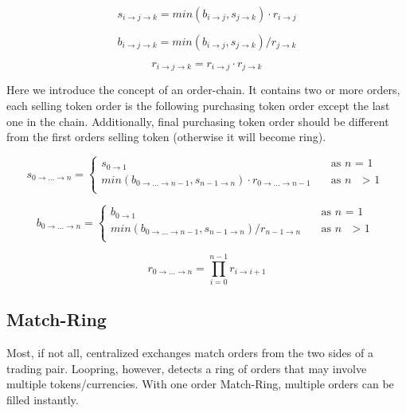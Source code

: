 \documentclass[UTF8,nofonts]{article}
\begin{document}
\begin{equation}
s_{i\rightarrow j\rightarrow k}=min(b_{i\rightarrow j}, s_{j\rightarrow k}) \cdot r_{i\rightarrow j}
\end{equation}

\begin{equation}
b_{i\rightarrow j\rightarrow k}=min(b_{i\rightarrow j}, s_{j\rightarrow k}) / r_{j\rightarrow k}
\end{equation}

\begin{equation}
r_{i\rightarrow j\rightarrow k}= r_{i\rightarrow j}\cdot r_{j\rightarrow k}
\end{equation}


Here we introduce the concept of an order-chain. It contains two or more orders, each selling token order is the following  purchasing token order except the last one in the chain. Additionally, final purchasing token order should be different from the first orders selling token (otherwise it will become ring).

\[ s_{0\rightarrow ...\rightarrow n} =
 \begin{cases}
  s_{0\rightarrow 1}   & \quad \text{as } n \text{ = 1}\\
  min(b_{0\rightarrow ...\rightarrow n-1}, s_{n-1\rightarrow n}) \cdot r_{0\rightarrow ...\rightarrow n-1} & \quad \text{as\ } n \text{ $>$ 1}\\
 \end{cases}
\]

\[ b_{0\rightarrow ...\rightarrow n} =
 \begin{cases}
  b_{0\rightarrow 1}   & \quad \text{as } n \text{ = 1}\\
  min(b_{0\rightarrow ...\rightarrow n-1}, s_{n-1\rightarrow n}) / r_{n-1\rightarrow n} & \quad \text{as\ } n \text{ $>$ 1}\\
 \end{cases}
\]


\[ r_{0\rightarrow ...\rightarrow n} = \prod_{i=0}^{n-1}{r_{i\rightarrow i+1}}
\]


\subsection{Match-Ring}

Most, if not all, centralized exchanges match orders from the two sides of a trading pair. Loopring, however, detects a ring of orders that may involve multiple tokens/currencies. With one order Match-Ring, multiple orders can be filled instantly.
\end{document}
